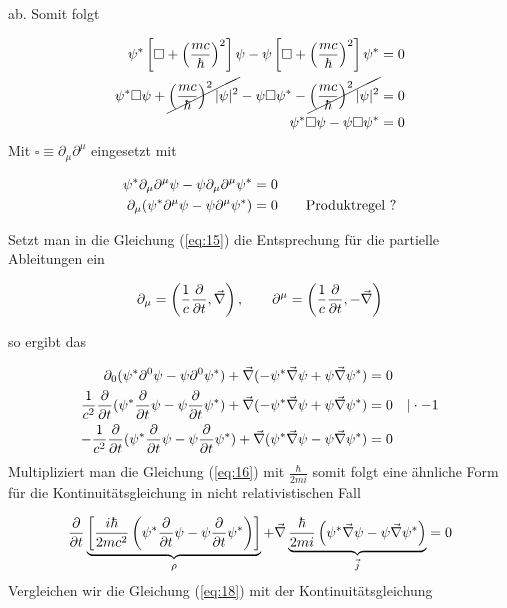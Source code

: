ab. Somit folgt

\begin{align}
  \label{eq:14}
   \psi^*\left[  \square + \left(\frac{mc}{\hbar}\right)^2\right]\psi - \psi \left[  \square + \left(\frac{mc}{\hbar}\right)^2\right]\psi^* &= 0 \\
   \psi^* \square \psi  +  \cancel{\left(\frac{mc}{\hbar}\right)^2 |\psi|^2} - \psi \square\psi^* - \cancel{ \left(\frac{mc}{\hbar}\right)^2|\psi|^2 }  &= 0 \\
   \psi^* \square \psi  - \psi \square\psi^*  &= 0 \\
\end{align}
Mit \(\square \equiv \partial_\mu\partial^\mu \) eingesetzt mit 


\begin{align}
  \label{eq:15}
     \psi^* \partial_\mu\partial^\mu  \psi  - \psi \partial_\mu\partial^\mu\psi^*  &= 0 \notag \\
   \partial_\mu(  \psi^* \partial^\mu  \psi  - \psi \partial^\mu\psi^* ) &= 0 \qquad \text{Produktregel ?}
\end{align}

Setzt man in die Gleichung (\ref{eq:15}) die Entsprechung für die partielle Ableitungen ein

\begin{equation}
  \label{eq:17}
  \partial_\mu = \left(\frac{1}{c}\pdiff_t,\vec \nabla\right), \qquad  \partial^\mu = \left(\frac{1}{c}\pdiff_t,-\vec \nabla\right)
\end{equation}

so ergibt das

\begin{align}
  \label{eq:16}
   \partial_0(  \psi^* \partial^0  \psi  - \psi \partial^0\psi^* ) + \vec \nabla ( - \psi^* \vec \nabla  \psi  + \psi \vec \nabla \psi^* )  &= 0 \notag \\
 \frac{1}{c^2}\pdiff_t (  \psi^* \pdiff_t \psi  - \psi \pdiff_t\psi^* ) + \vec \nabla ( - \psi^* \vec \nabla  \psi  + \psi \vec \nabla \psi^* )  &= 0 \quad |\cdot -1 \notag \\
- \frac{1}{c^2}\pdiff_t (  \psi^* \pdiff_t \psi  - \psi \pdiff_t\psi^* ) + \vec \nabla ( \psi^* \vec \nabla  \psi  - \psi \vec \nabla \psi^* )  &= 0 
\end{align}
Multipliziert man die Gleichung (\ref{eq:16}) mit \(\frac{\hbar}{2mi}\) somit folgt eine ähnliche Form für die Kontinuitätsgleichung in nicht relativistischen Fall

\begin{equation}
  \label{eq:18}
  \pdiff_t \underbr{ \left[ \frac{i\hbar}{2mc^2}\left( \psi^* \pdiff_t \psi  -  \psi \pdiff_t\psi^*\right) \right]}_{\rho} + \vec \nabla \underbr{\frac{\hbar}{2mi} \left( \psi^* \vec \nabla  \psi  - \psi \vec \nabla \psi^* \right)}_{\vec j}  = 0 \\
\end{equation}
Vergleichen wir die Gleichung (\ref{eq:18}) mit der Kontinuitätsgleichung 

